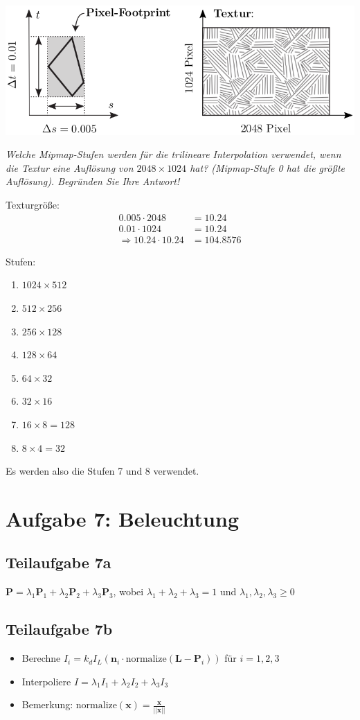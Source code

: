 \documentclass[a4paper]{scrartcl}
\begin{document}
\includegraphics*[width=0.8\linewidth, keepaspectratio]{6b.png}

\textit{Welche Mipmap-Stufen werden für die trilineare Interpolation verwendet, wenn die
Textur eine Auflösung von $2048\times1024$ hat? (Mipmap-Stufe 0 hat die größte Auflösung).
Begründen Sie Ihre Antwort!}

Texturgröße:
\begin{align}
    0.005 \cdot 2048 &= 10.24\\
    0.01 \cdot 1024 &= 10.24\\
    \Rightarrow 10.24 \cdot 10.24 &= 104.8576
\end{align}

Stufen:
\begin{enumerate}
    \item $1024 \times 512$
    \item $512 \times 256$
    \item $256 \times 128$
    \item $128 \times 64$
    \item $64 \times 32$
    \item $32 \times 16$
    \item $16 \times 8 = 128$
    \item $8 \times 4 = 32$
\end{enumerate}

Es werden also die Stufen 7 und 8 verwendet.

\clearpage
\section*{Aufgabe 7: Beleuchtung}
\subsection*{Teilaufgabe 7a}
$\mathbf{P} = \lambda_1 \mathbf{P}_1 + \lambda_2 \mathbf{P}_2 + \lambda_3 \mathbf{P}_3$, wobei $\lambda_1 + \lambda_2 + \lambda_3 = 1$
und $\lambda_1, \lambda_2, \lambda_3 \geq 0$

\subsection*{Teilaufgabe 7b}
\begin{itemize}
    \item Berechne $I_i = k_d I_L (\mathbf{n}_i \cdot \text{normalize}(\mathbf{L}-\mathbf{P}_i))$ für $i = 1,2,3$
    \item Interpoliere $I = \lambda_1 I_1 + \lambda_2 I_2 + \lambda_3 I_3$
    \item Bemerkung: $\text{normalize}(\mathbf{x}) = \frac{\mathbf{x}}{||\mathbf{x}||}$
\end{itemize}
\end{document}
